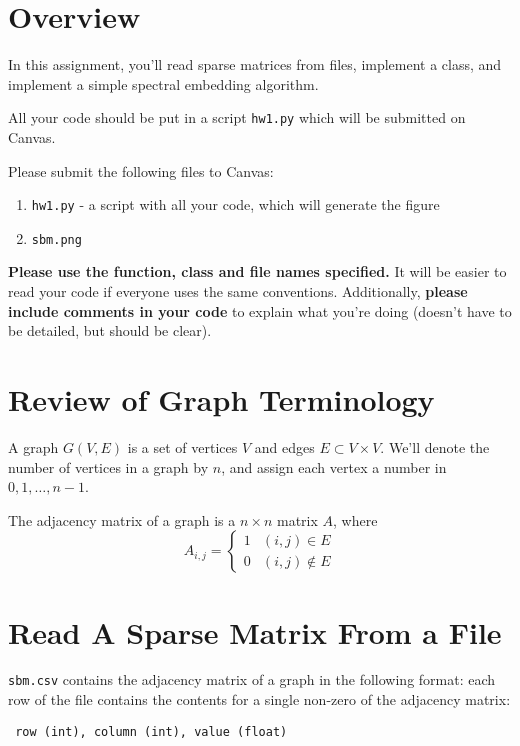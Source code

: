 \documentclass{article}
\begin{document}
\pagestyle{fancy}

\section*{Overview}

In this assignment, you'll read sparse matrices from files, implement a class, and implement a simple spectral embedding algorithm.

All your code should be put in a script {\tt hw1.py} which will be submitted on Canvas.

Please submit the following files to Canvas:
\begin{enumerate}
\item {\tt hw1.py} - a script with all your code, which will generate the figure
\item {\tt sbm.png}
\end{enumerate}

{\bf Please use the function, class and file names specified.}  It will be easier to read your code if everyone uses the same conventions.  Additionally, {\bf please include comments in your code} to explain what you're doing (doesn't have to be detailed, but should be clear). 


\section{Review of Graph Terminology}

A graph $G(V,E)$ is a set of vertices $V$ and edges $E\subset V\times V$.  We'll denote the number of vertices in a graph by $n$, and assign each vertex a number in $0,1,\dots, n-1$.

The adjacency matrix of a graph is a $n\times n$ matrix $A$, where
$$A_{i,j} = \begin{cases}
1 & (i,j) \in E\\
0 & (i,j) \notin E
\end{cases}$$


\section{Read A Sparse Matrix From a File}

{\tt sbm.csv} contains the adjacency matrix of a graph in the following format: each row of the file contains the contents for a single non-zero of the adjacency matrix:

{\tt
row (int), column (int), value (float)
}
\end{document}
